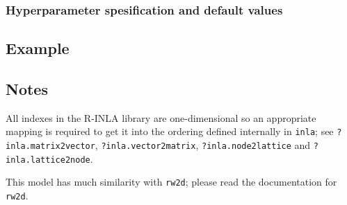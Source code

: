 \documentclass[a4paper,11pt]{article}
\begin{document}
\subsubsection*{Hyperparameter spesification and default values}



\subsection*{Example}



\subsection*{Notes}
All indexes in the R-INLA library are one-dimensional so an
appropriate mapping is required to get it into the ordering defined
internally in \verb|inla|; see \verb|?inla.matrix2vector|,
\verb|?inla.vector2matrix|, \verb|?inla.node2lattice| and
\verb|?inla.lattice2node|.

This model has much similarity with \verb|rw2d|; please read the
documentation for \verb|rw2d|.

\end{document}
